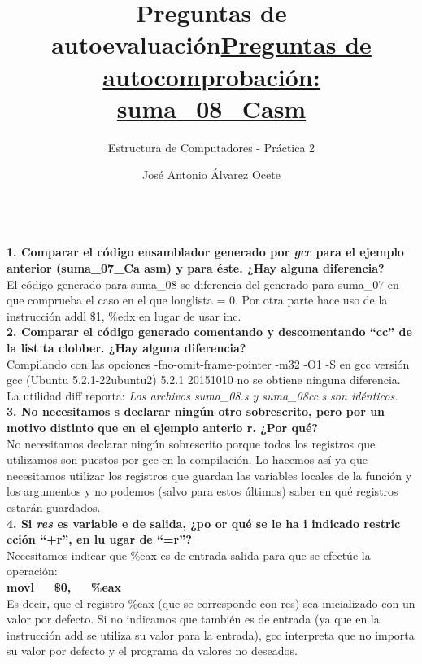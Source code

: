 \documentclass[11pt,a4paper]{article}
\title{Preguntas de autoevaluación}
\author{Estructura de Computadores - Práctica 2}
\date{José Antonio Álvarez Ocete}
\begin{document}
\maketitle

\title{\large{\textbf{\underline{Preguntas de autocomprobación: suma\_08\_Casm}}}} \\

\textbf{1. Comparar el código ensamblador generado por \emph{gcc} para el ejemplo anterior (suma\_07\_Ca asm) y para éste. ¿Hay alguna diferencia? } \\

El código generado para suma\_08 se diferencia del generado para suma\_07 en que comprueba el caso en el que longlista = 0. Por otra parte hace uso de la instrucción addl \$1, \%edx en lugar de usar inc. \\

\textbf{2.  Comparar el código generado comentando y  descomentando “cc” de la list ta clobber. ¿Hay alguna diferencia? } \\

Compilando con las opciones -fno-omit-frame-pointer -m32 -O1 -S en gcc versión gcc (Ubuntu 5.2.1-22ubuntu2) 5.2.1 20151010 no se obtiene ninguna diferencia.
La utilidad diff reporta: \emph{Los archivos suma\_08.s y suma\_08cc.s son idénticos.}\\

\textbf{3.  No necesitamos s declarar ningún otro sobrescrito, pero por un motivo distinto que en el ejemplo anterio r. ¿Por qué? } \\

No necesitamos declarar ningún sobrescrito porque todos los registros que utilizamos son puestos por gcc en la compilación. Lo hacemos así ya que necesitamos utilizar los registros que guardan las variables locales de la función y los argumentos y no podemos (salvo para estos últimos) saber en qué registros estarán guardados. \\

\textbf{4.	Si \emph{res} es variable e de salida, ¿po
or qué se le ha i indicado restric cción “+r”, en lu
ugar de “=r”? } \\

Necesitamos indicar que \%eax es de entrada salida para que se efectúe la operación: \\
\textbf{movl $\quad$ \$0, $\quad$ \%eax} \\
Es decir, que el registro \%eax (que se corresponde con res) sea inicializado con un valor por defecto. Si no indicamos que también es de entrada (ya que en la instrucción add se utiliza su valor para la entrada), gcc interpreta que no importa su valor por defecto y el programa da valores no deseados. \\
\end{document}
